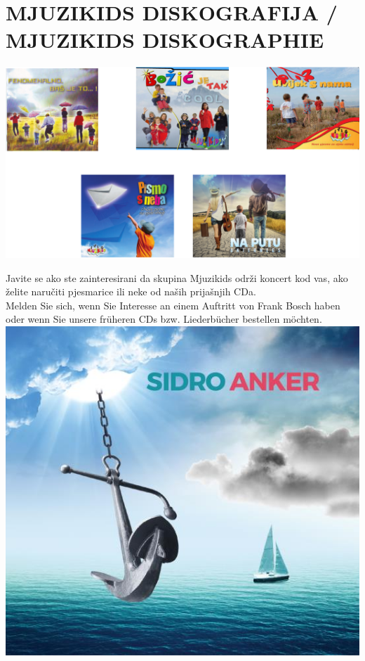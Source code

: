\documentclass[a4paper,twoside, svgnames]{article}
\begin{document}
\vfill

\newpage

\section*{MJUZIKIDS DISKOGRAFIJA / MJUZIKIDS DISKOGRAPHIE}

\begin{center}
\vspace{1cm}
\includegraphics[width=\linewidth]{images/cd}

\vspace{1cm}
Javite se ako ste zainteresirani da skupina Mjuzikids održi koncert kod vas,
ako želite naručiti pjesmarice ili neke od naših prijašnjih CDa.\\
\vspace{1cm}
Melden Sie sich, wenn Sie Interesse an einem Auftritt von Frank Bosch haben oder
wenn Sie unsere früheren CDs bzw. Liederbücher bestellen möchten.
\vfill
\includegraphics[width=0.5\linewidth]{images/Sidro_cd}
\vfill

\end{center}
\end{document}
